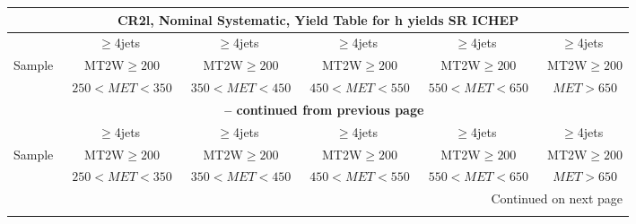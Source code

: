 \documentclass{article}
\begin{document}
 
 
 
 
\pagebreak 

 
 
 
 
\begin{longtable}{|l|c|c|c|c|c|} 
 
\multicolumn{6}{c}{ CR2l, Nominal Systematic, Yield Table for h yields SR ICHEP }\\* \hline 
  & $\ge$4jets  & $\ge$4jets  & $\ge$4jets  & $\ge$4jets  & $\ge$4jets \\* 
Sample  & ~MT2W$\ge200$  & ~MT2W$\ge200$  & ~MT2W$\ge200$  & ~MT2W$\ge200$  & ~MT2W$\ge200$ \\* 
  & ~$250<MET<350$  & ~$350<MET<450$  & ~$450<MET<550$  & ~$550<MET<650$  & ~$MET>650$ \\* 
\hline \hline 
\endfirsthead 
 
\multicolumn{6}{c}{{\bfseries \tablename\ \thetable{} -- continued from previous page}}\\* \hline 
  & $\ge$4jets  & $\ge$4jets  & $\ge$4jets  & $\ge$4jets  & $\ge$4jets \\* 
Sample  & ~MT2W$\ge200$  & ~MT2W$\ge200$  & ~MT2W$\ge200$  & ~MT2W$\ge200$  & ~MT2W$\ge200$ \\* 
  & ~$250<MET<350$  & ~$350<MET<450$  & ~$450<MET<550$  & ~$550<MET<650$  & ~$MET>650$ \\* 
\hline \hline 
\endhead 
 
\multicolumn{6}{|r|}{{Continued on next page}}\\* \hline 
\endfoot 
 
 
\endlastfoot 
 

\end{longtable}
\end{document}
